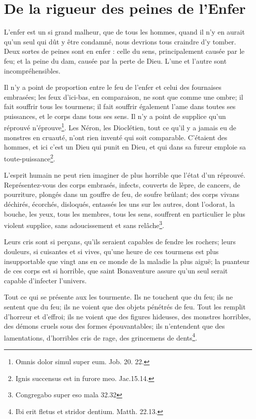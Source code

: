 \documentclass[instructions.tex]{subfiles}
\begin{document}
 
\chapter{De la rigueur des peines de l'Enfer}
 
L'enfer est un si grand malheur, que de tous les hommes, quand il n'y en aurait qu'un seul qui dût y être condamné, nous devrions tous craindre d'y tomber. Deux sortes de peines sont en enfer : celle du sens, principalement causée par le feu; et la peine du dam, causée par la perte de Dieu. L'une et l'autre sont incompréhensibles.

\primo Il n'y a point de proportion entre le feu de l'enfer et celui des fournaises embrasées; les feux d'ici-bas, en comparaison, ne sont que comme une ombre; il fait souffrir tous les tourmens; il fait souffrir également l'ame dans toutes ses puissances, et le corps dans tous ses sens. Il n'y a point de supplice qu'un réprouvé n'éprouve\footnote{Omnis dolor simul super eum. Job. 20. 22.}. Les Néron, les Dioclétien, tout ce qu'il y a jamais eu de monstres en cruauté, n'ont rien inventé qui soit comparable. C'étaient des hommes, et ici c'est un Dieu qui punit en Dieu, et qui dans sa fureur emploie sa toute-puissance\footnote{Ignis succensus est in furore meo. Jac.15.14.}.

L'esprit humain ne peut rien imaginer de plus horrible que l'état d'un réprouvé. Représentez-vous des corps embrasés, infects, couverts de lèpre, de cancers, de pourriture, plongés dans un gouffre de feu, de soufre brûlant; des corps vivans déchirés, écorchés, disloqués, entassés les uns sur les autres, dont l'odorat, la bouche, les yeux, tous les membres, tous les sens, souffrent en particulier le plus violent supplice, sans adoucissement et sans relâche\footnote{Congregabo super eso mala 32.32}. 

Leurs cris sont si perçans, qu'ils seraient capables de fendre les rochers; leurs douleurs, si cuisantes et si vives, qu'une heure de ces tourmens est plus insupportable que vingt ans en ce monde de la maladie la plus aiguë; la puanteur de ces corps est si horrible, que saint Bonaventure assure qu'un seul serait capable d'infecter l'univers.

Tout ce qui se présente aux les tourmente. Ils ne touchent que du feu; ils ne sentent que du feu; ils ne voient que des objets pénétrés de feu. Tout les remplit d'horreur et d'effroi; ils ne voient que des figures hideuses, des monstres horribles, des démons cruels sous des formes épouvantables; ils n'entendent que des lamentations, d'horribles cris de rage, des grincemens de dents\footnote{Ibi erit fletus et stridor dentium. Matth. 22.13.}.
\end{document}
